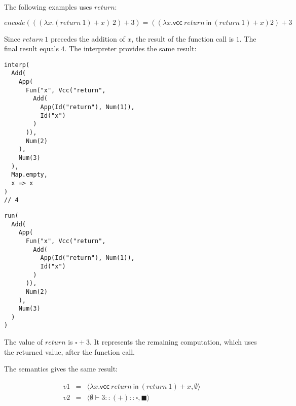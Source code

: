 The following examples uses $return$:

\[
\textit{encode}(((\lambda x.(return\ 1)+x)\ 2) + 3)=
((\lambda x.\textsf{vcc}\ return\ \textsf{in}\ (return\ 1)+x) 2)+3
\]

Since $return\ 1$ precedes the addition of $x$, the result of the function call
is $1$. The final result equals $4$. The interpreter provides the same result:

\begin{verbatim}
interp(
  Add(
    App(
      Fun("x", Vcc("return",
        Add(
          App(Id("return"), Num(1)),
          Id("x")
        )
      )),
      Num(2)
    ),
    Num(3)
  ),
  Map.empty,
  x => x
)
// 4
\end{verbatim}

\begin{verbatim}
run(
  Add(
    App(
      Fun("x", Vcc("return",
        Add(
          App(Id("return"), Num(1)),
          Id("x")
        )
      )),
      Num(2)
    ),
    Num(3)
  )
)
\end{verbatim}

The value of $return$ is $\square+3$. It represents the remaining computation,
which uses the returned value, after the function call.

The semantics gives the same result:

\[
\begin{array}{rcl}
v1&=&\langle\lambda x.\textsf{vcc}\ return\ \textsf{in}\ (return\
1)+x,\emptyset\rangle\\
v2&=&
\langle
\emptyset\vdash 3::(+)
::\square, \blacksquare\rangle
\end{array}
\]

